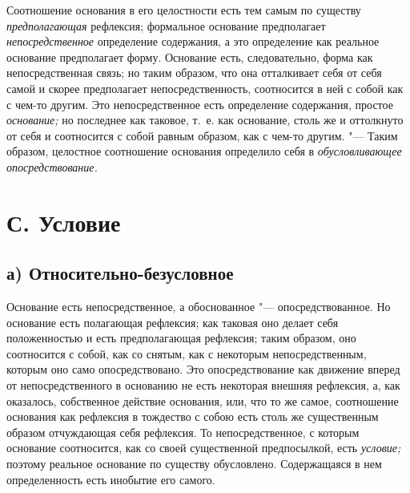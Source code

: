 Соотношение основания в его целостности есть тем самым по существу
{\em предполагающая} рефлексия; формальное основание
предполагает {\em непосредственное} определение
содержания, а это определение как реальное основание предполагает форму.
Основание есть, следовательно, форма как непосредственная связь; но таким
образом, что она отталкивает себя от себя самой и скорее предполагает
непосредственность, соотносится в ней с собой как с чем-то другим. Это
непосредственное есть определение содержания, простое
{\em основание;} но последнее как таковое, т.~е. как
основание, столь же и оттолкнуто от себя и соотносится с собой равным
образом, как с чем-то другим. "--- Таким образом, целостное соотношение
основания определило себя в {\em обусловливающее опосредствование.}

\section[С. Условие]{С. Условие}

\subsection[а) Относительно-безусловное]{а) Относительно-безусловное}

Основание есть непосредственное, а обоснованное
"--- опосредствованное. Но основание есть полагающая рефлексия; как таковая
оно делает себя положенностью и есть предполагающая рефлексия; таким
образом, оно соотносится с собой, как со снятым, как с некоторым
непосредственным, которым оно само опосредствовано. Это опосредствование
как движение вперед от непосредственного в основанию не есть некоторая
внешняя рефлексия, а, как оказалось, собственное действие основания, или,
что то же самое, соотношение основания как рефлексия в тождество с собою
есть столь же существенным образом отчуждающая себя рефлексия. То
непосредственное, с которым основание соотносится, как со своей
существенной предпосылкой, есть {\em условие;} поэтому
реальное основание по существу обусловлено. Содержащаяся в нем
определенность есть инобытие его самого.

